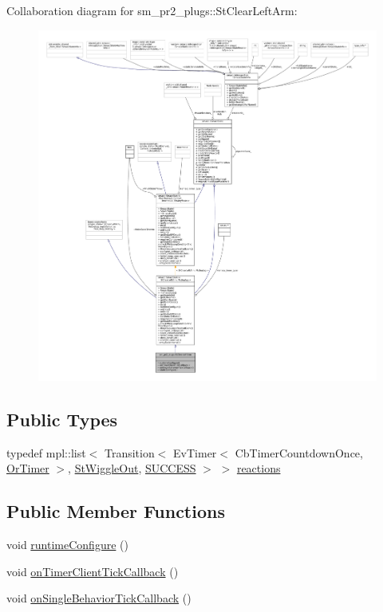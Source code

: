 Collaboration diagram for sm\+\_\+pr2\+\_\+plugs\+:\+:St\+Clear\+Left\+Arm\+:
\nopagebreak
\begin{figure}[H]
\begin{center}
\leavevmode
\includegraphics[width=350pt]{structsm__pr2__plugs_1_1StClearLeftArm__coll__graph}
\end{center}
\end{figure}
\subsection*{Public Types}
\begin{DoxyCompactItemize}
\item 
typedef mpl\+::list$<$ Transition$<$ Ev\+Timer$<$ Cb\+Timer\+Countdown\+Once, \hyperlink{classsm__pr2__plugs_1_1OrTimer}{Or\+Timer} $>$, \hyperlink{structsm__pr2__plugs_1_1StWiggleOut}{St\+Wiggle\+Out}, \hyperlink{classSUCCESS}{S\+U\+C\+C\+E\+SS} $>$ $>$ \hyperlink{structsm__pr2__plugs_1_1StClearLeftArm_ad3ce24ba9cd08d5c1ec12e041b3af125}{reactions}
\end{DoxyCompactItemize}
\subsection*{Public Member Functions}
\begin{DoxyCompactItemize}
\item 
void \hyperlink{structsm__pr2__plugs_1_1StClearLeftArm_a23696f6137f6e29e5144bafea171faaa}{runtime\+Configure} ()
\item 
void \hyperlink{structsm__pr2__plugs_1_1StClearLeftArm_acd6c1a301f1b9c7229d42df9fb871a58}{on\+Timer\+Client\+Tick\+Callback} ()
\item 
void \hyperlink{structsm__pr2__plugs_1_1StClearLeftArm_a948758fe2f92ba1711b142ddd78f03ab}{on\+Single\+Behavior\+Tick\+Callback} ()
\end{DoxyCompactItemize}
